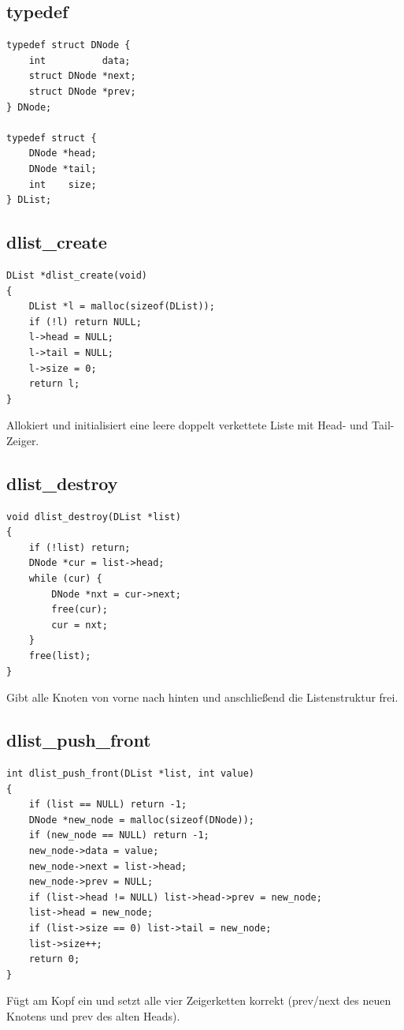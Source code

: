 \documentclass[10pt, a4paper]{article}
\begin{document}
\subsection{typedef}
\begin{lstlisting}
typedef struct DNode {
    int          data;
    struct DNode *next;
    struct DNode *prev;
} DNode;

typedef struct {
    DNode *head;
    DNode *tail;
    int    size;
} DList;
\end{lstlisting}

\subsection{dlist\_create}
\begin{lstlisting}
DList *dlist_create(void)
{
    DList *l = malloc(sizeof(DList));
    if (!l) return NULL;
    l->head = NULL;
    l->tail = NULL;
    l->size = 0;
    return l;
}
\end{lstlisting}
Allokiert und initialisiert eine leere doppelt verkettete Liste mit Head- und Tail-Zeiger.

\subsection{dlist\_destroy}
\begin{lstlisting}
void dlist_destroy(DList *list)
{
    if (!list) return;
    DNode *cur = list->head;
    while (cur) {
        DNode *nxt = cur->next;
        free(cur);
        cur = nxt;
    }
    free(list);
}
\end{lstlisting}
Gibt alle Knoten von vorne nach hinten und anschlie\ss end die Listenstruktur frei.

\subsection{dlist\_push\_front}
\begin{lstlisting}
int dlist_push_front(DList *list, int value)
{
    if (list == NULL) return -1;
    DNode *new_node = malloc(sizeof(DNode));
    if (new_node == NULL) return -1;
    new_node->data = value;
    new_node->next = list->head;
    new_node->prev = NULL;
    if (list->head != NULL) list->head->prev = new_node;
    list->head = new_node;
    if (list->size == 0) list->tail = new_node;
    list->size++;
    return 0;
}
\end{lstlisting}
F\"ugt am Kopf ein und setzt alle vier Zeigerketten korrekt (prev/next des neuen Knotens und prev des alten Heads).
\end{document}
